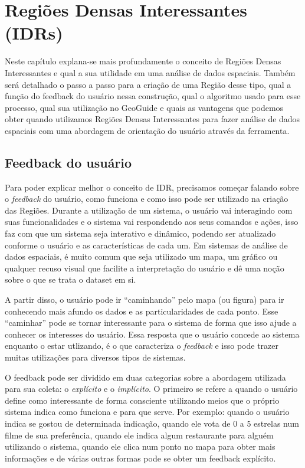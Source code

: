 \chapter{Regiões Densas Interessantes (IDRs)}
\label{chap:idrs}

Neste capítulo explana-se mais profundamente o conceito de Regiões Densas Interessantes e qual a sua utilidade em uma análise de dados espaciais. Também será detalhado o passo a passo para a criação de uma Região desse tipo, qual a função do feedback do usuário nessa construção, qual o algoritmo usado para esse processo, qual sua utilização no GeoGuide e quais as vantagens que podemos obter quando utilizamos Regiões Densas Interessantes para fazer análise de dados espaciais com uma abordagem de orientação do usuário através da ferramenta.

\section{Feedback do usuário}

Para poder explicar melhor o conceito de IDR, precisamos começar falando sobre o \textit{feedback} do usuário, como funciona e como isso pode ser utilizado na criação das Regiões. Durante a utilização de um sistema, o usuário vai interagindo com suas funcionalidades e o sistema vai respondendo aos seus comandos e ações, isso faz com que um sistema seja interativo e dinâmico, podendo ser atualizado conforme o usuário e as características de cada um. Em sistemas de análise de dados espaciais, é muito comum que seja utilizado um mapa, um gráfico ou qualquer recuso visual que facilite a interpretação do usuário e dê uma noção sobre o que se trata o dataset em si.

A partir disso, o usuário pode ir ``caminhando'' pelo mapa (ou figura) para ir conhecendo mais afundo os dados e as particularidades de cada ponto. Esse ``caminhar'' pode se tornar interessante para o sistema de forma que isso ajude a conhecer os interesses do usuário. Essa resposta que o usuário concede ao sistema enquanto o estar utlizando, é o que caracteriza o \textit{feedback} e isso pode trazer muitas utilizações para diversos tipos de sistemas.

O feedback pode ser dividido em duas categorias sobre a abordagem utilizada para sua coleta: o \textit{explícito} e o \textit{implícito}. O primeiro se refere a quando o usuário define como interessante de forma consciente utilizando meios que o próprio sistema indica como funciona e para que serve. Por exemplo: quando o usuário indica se gostou de determinada indicação, quando ele vota de 0 a 5 estrelas num filme de sua preferência, quando ele indica algum restaurante para alguém utilizando o sistema, quando ele clica num ponto no mapa para obter mais informações e de várias outras formas pode se obter um feedback explícito.


